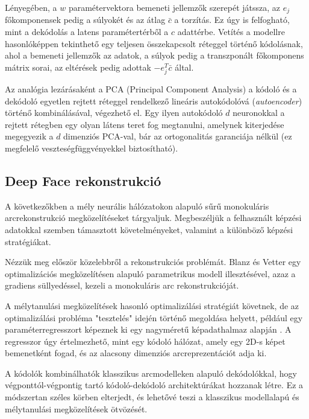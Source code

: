 \documentclass[12pt,a4]{article}
\begin{document}
	\cite{3dmm}Lényegében, a $w$ paramétervektora bemeneti jellemzők szerepét játssza, az $e_j$ főkomponensek pedig a súlyokét és az átlag $\bar{c}$ a torzítás.
	Ez úgy is felfogható, mint a dekódolás a latens paramétertérből a $c$ adattérbe. Vetítés a modellre
	hasonlóképpen tekinthető egy teljesen összekapcsolt réteggel történő kódolásnak,
	ahol a bemeneti jellemzők az adatok, a súlyok pedig a transzponált főkomponens mátrix sorai, az eltérések pedig adottak $-e^{T}_{j}\bar{c}$ által.
	
	
	 Az analógia lezárásaként a PCA (Principal Component Analysis) a kódoló és a dekódoló egyetlen rejtett réteggel rendelkező lineáris autokódolóvá (\textit{autoencoder}) történő kombinálásával, végezhető el.
	Egy ilyen autokódoló $d$ neuronokkal a
	rejtett rétegben egy olyan látens teret fog megtanulni, amelynek kiterjedése megegyezik a $d$
	dimenziós PCA-val, bár az ortogonalitás garanciája nélkül
	(ez megfelelő veszteségfüggvényekkel biztosítható).
	
	\subsection{Deep Face rekonstrukció}
	
	 A következőkben a mély neurális hálózatokon alapuló sűrű monokuláris arcrekonstrukció megközelítéseket tárgyaljuk. Megbeszéljük
	a felhasznált képzési adatokkal szemben támasztott követelményeket, valamint a különböző képzési
	stratégiákat. 
	
	
	Nézzük meg először közelebbről a rekonstrukciós problémát. Blanz és Vetter \cite{blanzvetter} egy optimalizációs megközelítésen alapuló parametrikus modell illesztésével, azaz a gradiens süllyedéssel, kezeli a monokuláris arc rekonstrukcióját. 
	
	
	 A mélytanulási megközelítések hasonló optimalizálási stratégiát követnek, de az optimalizálási probléma 
	"tesztelés" idején történő megoldása helyett, például egy paraméterregresszort képeznek ki egy nagyméretű képadathalmaz alapján \cite{3dmm}. A regresszor úgy értelmezhető, mint egy kódoló hálózat, amely egy 2D-s képet
	bemenetként fogad, és az alacsony dimenziós arcreprezentációt adja ki. 
	
	
	A
	kódolók kombinálhatók klasszikus arcmodelleken alapuló dekódolókkal,
	hogy végponttól-végpontig tartó kódoló-dekódoló architektúrákat hozzanak létre.
	Ez a módszertan széles körben elterjedt, és lehetővé teszi a klasszikus
	modellalapú és mélytanulási megközelítések ötvözését.
	
\end{document}
